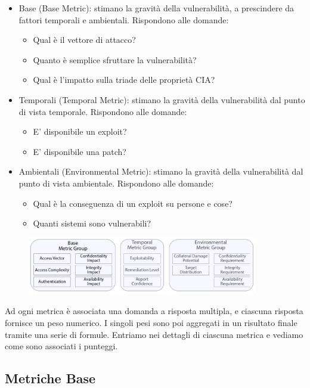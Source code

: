 \begin{itemize}
    \item Base (Base Metric): stimano la gravità della vulnerabilità, a prescindere da
fattori temporali e ambientali. Rispondono alle domande:
\begin{itemize}
    \item Qual è il vettore di attacco?
    \item Quanto è semplice sfruttare la vulnerabilità?
    \item Qual è l’impatto sulla triade delle proprietà CIA?
\end{itemize}
    \item Temporali (Temporal Metric): stimano la gravità della vulnerabilità dal punto di vista
temporale. Rispondono alle domande:
\begin{itemize}
    \item E’ disponibile un exploit?
    \item E’ disponibile una patch?
\end{itemize}
    \item Ambientali (Environmental Metric): stimano la gravità della vulnerabilità dal punto di vista
ambientale. Rispondono alle domande:
\begin{itemize}
    \item Qual è la conseguenza di un exploit su persone e cose?
    \item Quanti sistemi sono vulnerabili? 
\end{itemize}
\end{itemize}
\begin{figure}[hbpt!]
    \centering
    \includegraphics[width=0.9\textwidth]{./Images/cap2/2.7.png}
\end{figure}
\FloatBarrier
Ad ogni metrica è associata una domanda
a risposta multipla, e ciascuna risposta fornisce un peso numerico. I singoli pesi sono poi aggregati in un
risultato finale tramite una serie di formule. Entriamo nei dettagli di ciascuna metrica
e vediamo come sono associati i punteggi.
\subsection{Metriche Base}
